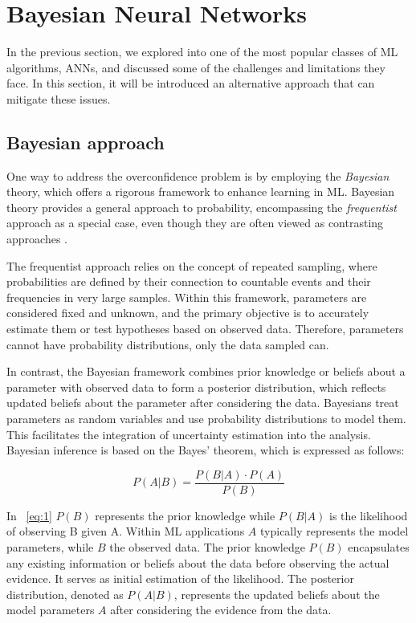 \section{Bayesian Neural Networks}

In the previous section, we explored into one of the most popular classes of ML algorithms, ANNs, and discussed some of the challenges and limitations they face. In this section, it will be introduced an alternative approach that can mitigate these issues.

\subsection{Bayesian approach}

One way to address the overconfidence problem is by employing the \textit{Bayesian} theory, which offers a rigorous framework to enhance learning in ML. Bayesian theory provides a general approach to probability, encompassing the \textit{frequentist} approach as a special case, even though they are often viewed as contrasting approaches \cite{noauthororeditor}. 

The frequentist approach relies on the concept of repeated sampling, where probabilities are defined by their connection to countable events and their frequencies in very large samples. Within this framework, parameters are considered fixed and unknown, and the primary objective is to accurately estimate them or test hypotheses based on observed data. Therefore, parameters cannot have probability distributions, only the data sampled can.

In contrast, the Bayesian framework combines prior knowledge or beliefs about a parameter with observed data to form a posterior distribution, which reflects updated beliefs about the parameter after considering the data. Bayesians treat parameters as random variables and use probability distributions to model them. This facilitates the integration of uncertainty estimation into the analysis. Bayesian inference is based on the Bayes' theorem, which is expressed as follows:

\begin{equation} \label{eq:1}
	P(A|B) = \frac{P(B|A) \cdot P(A)}{P(B)}
\end{equation}

In \Eq~\ref{eq:1} $P(B)$ represents the prior knowledge while $P(B|A)$ is the likelihood of observing B given A. Within ML applications $A$ typically represents the model parameters, while $B$ the observed data. The prior knowledge $P(B)$ encapsulates any existing information or beliefs about the data before observing the actual evidence. It serves as initial estimation of the likelihood. The posterior distribution, denoted as $P(A|B)$, represents the updated beliefs about the model parameters $A$ after considering the evidence from the data.

